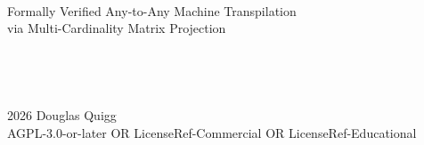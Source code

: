\begin{titlepage}
  \centering
  \vfill
  {\Large{}} \\
  \vspace{1cm}
  {\large Formally Verified Any-to-Any Machine Transpilation \\
  via Multi-Cardinality Matrix Projection} \\
  \vspace{2cm}
   \\
  \vspace{1cm}
  {\large{}} \\
  \vfill
   \\
  \vfill
   \\
  \vfill
  {\footnotesize \textcopyright{} 2026 Douglas Quigg \\
  AGPL-3.0-or-later OR LicenseRef-Commercial OR LicenseRef-Educational}
\end{titlepage}
